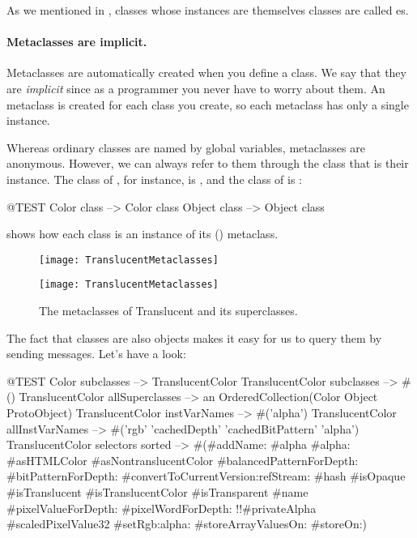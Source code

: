 \documentclass[a4paper,10pt,twoside]{book}
\begin{document}

As we mentioned in , classes whose instances are themselves classes are called es.

\paragraph{Metaclasses are implicit.}
Metaclasses are automatically created when you define a class.
We say that they are \emph{implicit} since as a programmer you never have to worry about them.
An  metaclass is created for each class you create, so each metaclass has only a single instance.

Whereas ordinary classes are named by global variables, metaclasses are anonymous.
However, we can always refer to them through the class that is their instance.
The class of , for instance, is , and the class of  is :
\begin{code}{@TEST}
Color class   --> Color class
Object class --> Object class
\end{code}

\noindent
{} shows how each class is an instance of its () metaclass.

\begin{center}
\begin{figure}[!ht]
\ifluluelse
	{\centerline {\texttt{[image: TranslucentMetaclasses]}}}
	{\centerline {\texttt{[image: TranslucentMetaclasses]}}}
\caption{The metaclasses of Translucent and its superclasses.\label{fig:translucentmetaclasses}}
\end{figure}
\end{center}

The fact that classes are also objects makes it easy for us to query them by sending messages.
Let's have a look:

\begin{code}{@TEST}
Color subclasses                           --> {TranslucentColor}
TranslucentColor subclasses         --> #()
TranslucentColor allSuperclasses  --> an OrderedCollection(Color Object ProtoObject)
TranslucentColor instVarNames     --> #('alpha')
TranslucentColor allInstVarNames --> #('rgb' 'cachedDepth' 'cachedBitPattern' 'alpha')
TranslucentColor selectors sorted --> #(#addName: #alpha #alpha: #asHTMLColor #asNontranslucentColor #balancedPatternForDepth: #bitPatternForDepth: #convertToCurrentVersion:refStream: #hash #isOpaque #isTranslucent #isTranslucentColor #isTransparent #name #pixelValueForDepth: #pixelWordForDepth: !!#privateAlpha #scaledPixelValue32 #setRgb:alpha: #storeArrayValuesOn: #storeOn:)
\end{code}
\end{document}
